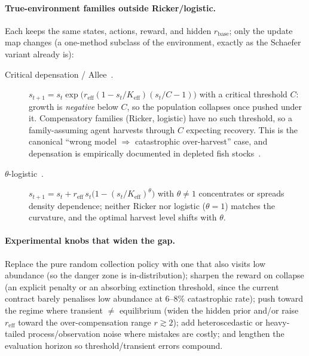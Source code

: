 \documentclass[11pt]{article}
\newcommand{\reff}{r_{\mathrm{eff}}}
\newcommand{\Keff}{K_{\mathrm{eff}}}
\newcommand{\rbase}{r_{\mathrm{base}}}
\begin{document}
\paragraph{True-environment families outside Ricker/logistic.}
Each keeps the same states, actions, reward, and hidden $\rbase$; only the update
map changes (a one-method subclass of the environment, exactly as the Schaefer
variant already is):
\begin{description}
    \item[Critical depensation / Allee~\cite{liermann2001, courchamp2008}.]
    $s_{t+1} = s_t \exp\!\big(\reff(1 - s_t/\Keff)(s_t/C - 1)\big)$ with a critical
    threshold $C$: growth is \emph{negative} below $C$, so the population collapses
    once pushed under it. Compensatory families (Ricker, logistic) have no such
    threshold, so a family-assuming agent harvests through $C$ expecting recovery.
    This is the canonical ``wrong model $\Rightarrow$ catastrophic over-harvest''
    case, and depensation is empirically documented in depleted fish
    stocks~\cite{liermann2001}.
    \item[$\theta$-logistic~\cite{gilpin1973theta}.]
    $s_{t+1} = s_t + \reff\, s_t\big(1 - (s_t/\Keff)^{\theta}\big)$ with
    $\theta \neq 1$ concentrates or spreads density dependence; neither Ricker nor
    logistic ($\theta = 1$) matches the curvature, and the optimal harvest level
    shifts with $\theta$.
    
\end{description}

\paragraph{Experimental knobs that widen the gap.}
Replace the pure random collection policy with one that also visits low abundance
(so the danger zone is in-distribution); sharpen the reward on collapse (an explicit
penalty or an absorbing extinction threshold, since the current contract barely
penalises low abundance at $6$--$8\%$ catastrophic rate); push toward the regime
where transient $\neq$ equilibrium (widen the hidden prior and/or raise $\reff$
toward the over-compensation range $r \gtrsim 2$); add heteroscedastic or
heavy-tailed process/observation noise where mistakes are costly; and lengthen the
evaluation horizon so threshold/transient errors compound.
\end{document}
